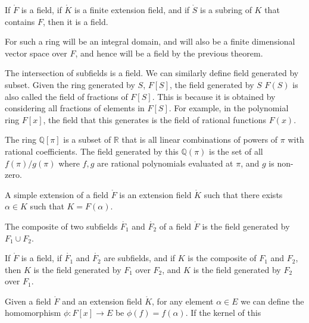    \begin{theorem}
        If $\ring{F}$ is a field, if $\ring{K}$ is a finite extension field,
        and if $\ring{S}$ is a subring of $K$ that contains $F$, then it is
        a field.
    \end{theorem}
    \begin{theorem}
        For such a ring will be an integral domain, and will also be a
        finite dimensional vector space over $F$, and hence will be a field
        by the previous theorem.
    \end{theorem}
    The intersection of subfields is a field. We can similarly define field
    generated by subset. Given the ring generated by $S$, $F[S]$, the field
    generated by $S$ $F(S)$ is also called the field of fractions of $F[S]$.
    This is because it is obtained by considering all fractions of elements
    in $F[S]$. For example, in the polynomial ring $F[x]$, the field that
    this generates is the field of rational functions $F(x)$.
    \begin{example}
        The ring $\mathbb{Q}[\pi]$ is a subset of $\mathbb{R}$ that is all
        linear combinations of powers of $\pi$ with rational coefficients.
        The field generated by this $\mathbb{Q}(\pi)$ is the set of all
        $f(\pi)/g(\pi)$ where $f,g$ are rational polynomials evaluated at
        $\pi$, and $g$ is non-zero.
    \end{example}
    \begin{definition}
        A simple extension of a field $\ring{F}$ is an extension field
        $\ring{K}$ such that there exists $\alpha\in{K}$ such that
        $K=F(\alpha)$.
    \end{definition}
    \begin{definition}
        The composite of two subfields $\ring{F_{1}}$ and $\ring{F_{2}}$
        of a field $\ring{F}$ is the field generated by $F_{1}\cup{F}_{2}$.
    \end{definition}
    \begin{theorem}
        If $\ring{F}$ is a field, if $\ring{F_{1}}$ and $\ring{F_{2}}$ are
        subfields, and if $K$ is the composite of $F_{1}$ and $F_{2}$,
        then $K$ is the field generated by $F_{1}$ over $F_{2}$, and $K$ is
        the field generated by $F_{2}$ over $F_{1}$.
    \end{theorem}
    Given a field $\ring{F}$ and an extension field $\ring{K}$, for any
    element $\alpha\in{E}$ we can define the homomorphism
    $\phi:F[x]\rightarrow{E}$ be $\phi(f)=f(\alpha)$. If the kernel of this
